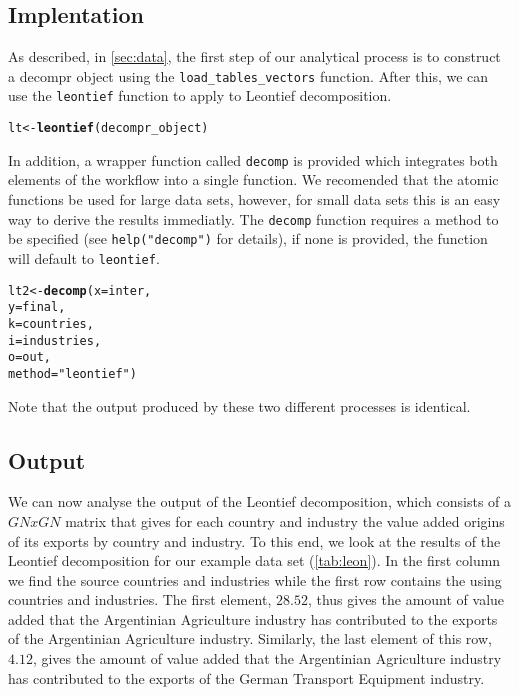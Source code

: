 \documentclass[a4paper]{article}\usepackage[]{graphicx}\usepackage[]{color}
\makeatletter
\newcommand{\hlstr}[1]{\textcolor[rgb]{0.192,0.494,0.8}{#1}}%
\newcommand{\hlstd}[1]{\textcolor[rgb]{0.345,0.345,0.345}{#1}}%
\newcommand{\hlkwb}[1]{\textcolor[rgb]{0.69,0.353,0.396}{#1}}%
\newcommand{\hlkwc}[1]{\textcolor[rgb]{0.333,0.667,0.333}{#1}}%
\newcommand{\hlkwd}[1]{\textcolor[rgb]{0.737,0.353,0.396}{\textbf{#1}}}%
\newenvironment{kframe}{%
 \def\at@end@of@kframe{}%
 \ifinner\ifhmode%
  \def\at@end@of@kframe{\end{minipage}}%
  \begin{minipage}{\columnwidth}%
 \fi\fi%
 \def\FrameCommand##1{\hskip\@totalleftmargin \hskip-\fboxsep
 \colorbox{shadecolor}{##1}\hskip-\fboxsep
     \hskip-\linewidth \hskip-\@totalleftmargin \hskip\columnwidth}%
 \MakeFramed {\advance\hsize-\width
   \@totalleftmargin\z@ \linewidth\hsize
   \@setminipage}}%
 {\par\unskip\endMakeFramed%
 \at@end@of@kframe}
\newenvironment{knitrout}{}{} %
\makeatother
\begin{document}
\subsection{Implentation}
As described, in \cref{sec:data}, the first step of our analytical process is to construct a decompr object using the \verb!load_tables_vectors! function. After this, we can use the \verb!leontief! function to apply to Leontief decomposition.
\begin{knitrout}
\color{fgcolor}\begin{kframe}
\begin{alltt}
\hlstd{lt} \hlkwb{<-} \hlkwd{leontief}\hlstd{( decompr_object )}
\end{alltt}
\end{kframe}
\end{knitrout}

In addition, a wrapper function called \verb!decomp! is provided which integrates both elements of the workflow into a single function.
We recomended that the atomic functions be used for large data sets, however, for small data sets this is an easy way to derive the results immediatly.
The \verb!decomp! function requires a method to be specified (see \verb!help("decomp")! for details), if none is provided, the function will default to \verb!leontief!.

\begin{knitrout}
\color{fgcolor}\begin{kframe}
\begin{alltt}
\hlstd{lt2} \hlkwb{<-} \hlkwd{decomp}\hlstd{(} \hlkwc{x} \hlstd{= inter,}
               \hlkwc{y} \hlstd{= final,}
               \hlkwc{k} \hlstd{= countries,}
               \hlkwc{i} \hlstd{= industries,}
               \hlkwc{o} \hlstd{= out,}
               \hlkwc{method} \hlstd{=} \hlstr{"leontief"} \hlstd{)}
\end{alltt}
\end{kframe}
\end{knitrout}

Note that the output produced by these two different processes is identical.

\subsection{Output}
We can now analyse the output of the Leontief decomposition, which consists of a $GNxGN$ matrix that gives for each country and industry the
value added origins of its exports by country and industry.
To this end, we look at the results of the Leontief decomposition for our example data set (\cref{tab:leon}).
In the first column we find the source countries and industries while the first row contains the using countries and industries.
The first element, $28.52$, thus gives the amount of value added that the Argentinian Agriculture industry has contributed to the exports of the Argentinian Agriculture industry.
Similarly, the last element of this row, $4.12$, gives the amount of value added that the Argentinian Agriculture industry has contributed 
to the exports of the German Transport Equipment industry.
\end{document}

